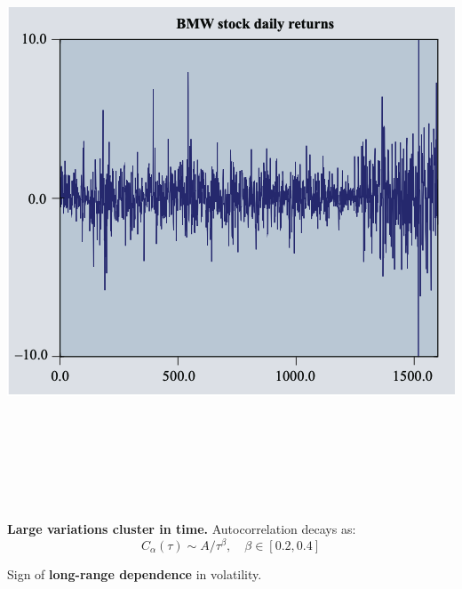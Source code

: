 \documentclass[final]{beamer}
\begin{document}
\begin{frame}[t]
\begin{columns}[t]
\begin{column}{.48\linewidth}
\begin{tcolorbox}[mybox, title=Volatility Clustering]
\begin{center}
\includegraphics[width=0.95\linewidth,height=18cm,keepaspectratio]{figure1_bmw.png}
\end{center}
\vspace{0.3cm}
\large
\textbf{Large variations cluster in time.} Autocorrelation decays as: 
$$C_\alpha(\tau) \sim A/\tau^\beta, \quad \beta \in [0.2, 0.4]$$

Sign of \textbf{long-range dependence} in volatility.
\end{tcolorbox}

\vspace{0.5cm}


\end{column}
\end{columns}
\end{frame}
\end{document}
